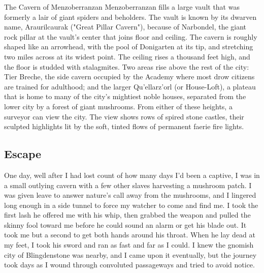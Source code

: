 \documentclass[10pt,a4paper,twoside,twocolumn,openany,bg=print,nodeprecatedcode]{dndbook}
\begin{document}
\begin{DndComment}{The Cavern of Menzoberranzan}
Menzoberranzan fills a large vault that was formerly a lair of giant spiders and beholders. The vault is known by its dwarven name, Araurilcaurak ("Great Pillar Cavern"), because of Narbondel, the giant rock pillar at the vault's center that joins floor and ceiling. The cavern is roughly shaped like an arrowhead, with the pool of Donigarten at its tip, and stretching two miles across at its widest point. The ceiling rises a thousand feet high, and the floor is studded with stalagmites.
Two areas rise above the rest of the city: Tier Breche, the side cavern occupied by the Academy where most drow citizens are trained for adulthood; and the larger Qu'ellarz'orl (or House-Loft), a plateau that is home to many of the city's mightiest noble houses, separated from the lower city by a forest of giant mushrooms. From either of these heights, a surveyor can view the city. The view shows rows of spired stone castles, their sculpted highlights lit by the soft, tinted flows of permanent faerie fire lights.
\end{DndComment}

\subsection{Escape}
One day, well after I had lost count of how many days I'd been a captive, I was in a small outlying cavern with a few other slaves harvesting a mushroom patch. I was given leave to answer nature's call away from the mushrooms, and I lingered long enough in a side tunnel to force my watcher to come and find me. I took the first lash he offered me with his whip, then grabbed the weapon and pulled the skinny fool toward me before he could sound an alarm or get his blade out. It took me but a second to get both hands around his throat. When he lay dead at my feet, I took his sword and ran as fast and far as I could. I knew the gnomish city of Blingdenstone was nearby, and I came upon it eventually, but the journey took days as I wound through convoluted passageways and tried to avoid notice.
\end{document}
